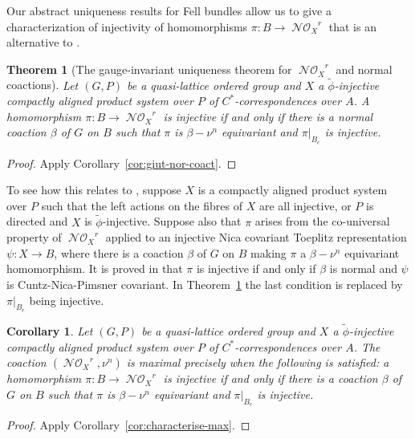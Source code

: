 \documentclass[12pt]{amsart}
\theoremstyle{plain}
\newtheorem{cor}[theorem]{Corollary}
\theoremstyle{remark}
\theoremstyle{definition}
\numberwithin{equation}{section}
\theoremstyle{plain}
\newtheorem{thm}[theorem]{Theorem}
\theoremstyle{definition}
\theoremstyle{remark}
\begin{document}
Our abstract uniqueness results for Fell bundles allow us to give a characterization of
injectivity of homomorphisms $\pi:B\to {\operatorname{\mathcal{NO}}_{\!{X}}}^{r}$ that is an alternative to \cite[Corollary 4.9]{CLSV}.

\begin{thm}[The gauge-invariant uniqueness theorem for ${\operatorname{\mathcal{NO}}_{\!{X}}}^{r}$ and normal coactions]
\label{GIUT-NOXreduced}
 Let
$(G, P)$ be a quasi-lattice ordered group and $X$ a $\tilde\phi$-injective compactly aligned product system over $P$ of
$C^*$-correspondences over $A$. A homomorphism
$\pi:B\to {\operatorname{\mathcal{NO}}_{\!{X}}}^{r}$ is injective if and only if there is a normal coaction $\beta$ of $G$ on $B$ such that
$\pi$ is $\beta-\nu^n$ equivariant and $\pi\vert_{B_e}$ is injective.
\end{thm}

\begin{proof} Apply Corollary~\ref{cor:giut-nor-coact}.
\end{proof}

To see how this relates to \cite{CLSV}, suppose $X$ is a compactly aligned product system over $P$ such that the
left actions on the fibres of $X$ are all injective, or $P$ is directed and $X$ is $\tilde\phi$-injective. Suppose also that
$\pi$ arises from the co-universal property of ${\operatorname{\mathcal{NO}}_{\!{X}}}^{r}$ applied to an injective Nica covariant
Toeplitz representation $\psi:X\to B$, where there is a coaction $\beta$ of $G$ on $B$ making $\pi$ a $\beta-\nu^n$ equivariant homomorphism.
It is proved in \cite[Corollary 4.9]{CLSV} that $\pi$ is injective if and only if $\beta$ is normal and $\psi$  is Cuntz-Nica-Pimsner covariant.
In Theorem~\ref{GIUT-NOXreduced} the last condition is replaced by  $\pi\vert_{B_e}$ being injective.

\begin{cor}
Let
$(G, P)$ be a quasi-lattice ordered group and $X$ a $\tilde\phi$-injective compactly aligned product system over $P$ of
$C^*$-correspondences over $A$. The coaction $({\operatorname{\mathcal{NO}}_{\!{X}}}^{r}, \nu^n)$ is maximal precisely when the following is satisfied: a
homomorphism $\pi:B\to {\operatorname{\mathcal{NO}}_{\!{X}}}^{r}$ is injective if and only if there is a coaction $\beta$ of $G$ on $B$ such that
$\pi$ is $\beta-\nu^n$ equivariant and $\pi\vert_{B_e}$ is injective.
\end{cor}

\begin{proof} Apply Corollary~\ref{cor:characterise-max}.
\end{proof}
\end{document}
